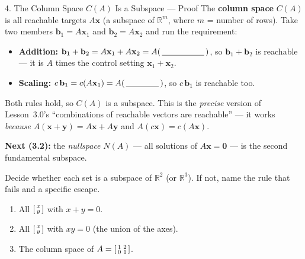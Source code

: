 \documentclass[10pt]{article}
\newcommand{\xx}{\mathbf{x}}
\newcommand{\yy}{\mathbf{y}}
\newcommand{\bb}{\mathbf{b}}
\newcommand{\zero}{\mathbf{0}}
\begin{document}
\begin{notesbox}{4. The Column Space $C(A)$ Is a Subspace --- Proof}
The \textbf{column space} $C(A)$ is all reachable targets $A\xx$ (a subspace of $\mathbb{R}^m$,
where $m$ = number of rows). Take two members $\bb_1=A\xx_1$ and $\bb_2=A\xx_2$ and run the
requirement:
\begin{itemize}[leftmargin=1.5em, itemsep=2pt]
  \item \textbf{Addition:} $\bb_1+\bb_2=A\xx_1+A\xx_2=A(\,\blank{1.8cm}\,)$, so $\bb_1+\bb_2$ is
        reachable --- it is $A$ times the control setting $\xx_1+\xx_2$.
  \item \textbf{Scaling:} $c\,\bb_1=c(A\xx_1)=A(\,\blank{1.4cm}\,)$, so $c\,\bb_1$ is reachable too.
\end{itemize}
Both rules hold, so $C(A)$ is a subspace. This is the \emph{precise} version of Lesson~3.0's
``combinations of reachable vectors are reachable'' --- it works \emph{because}
$A(\xx+\yy)=A\xx+A\yy$ and $A(c\xx)=c(A\xx)$.

\vspace{3pt}
\textbf{Next (3.2):} the \emph{nullspace} $N(A)$ --- all solutions of $A\xx=\zero$ --- is the second
fundamental subspace.
\end{notesbox}

\begin{practicebox}
Decide whether each set is a subspace of $\mathbb{R}^2$ (or $\mathbb{R}^3$). If not, name the rule
that fails and a specific escape.
\begin{enumerate}[leftmargin=1.6em, itemsep=4pt]
  \item All $\begin{bsmallmatrix} x\\y \end{bsmallmatrix}$ with $x+y=0$. \writeline
  \item All $\begin{bsmallmatrix} x\\y \end{bsmallmatrix}$ with $xy=0$ (the union of the axes). \writeline
  \item The column space of $A=\begin{bsmallmatrix} 1 & 2 \\ 0 & 1 \end{bsmallmatrix}$. \writeline
\end{enumerate}
\end{practicebox}
\end{document}
